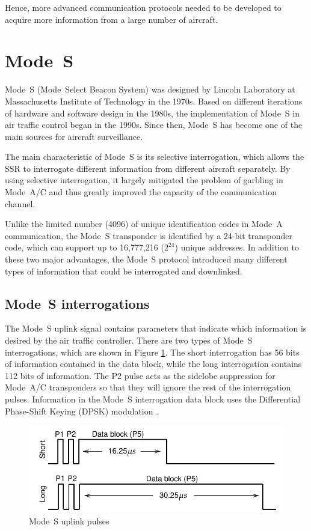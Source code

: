 Hence, more advanced communication protocols needed to be developed to acquire more information from a large number of aircraft.



\section{Mode~S}

Mode~S (Mode~Select Beacon System) was designed by Lincoln Laboratory at Massachusetts Institute of Technology in the 1970s. Based on different iterations of hardware and software design in the 1980s, the implementation of Mode~S in air traffic control began in the 1990s. Since then, Mode~S has become one of the main sources for aircraft surveillance.

The main characteristic of Mode~S is its selective interrogation, which allows the SSR to interrogate different information from different aircraft separately. By using selective interrogation, it largely mitigated the problem of garbling in Mode~A/C and thus greatly improved the capacity of the communication channel.

Unlike the limited number (4096) of unique identification codes in Mode~A communication, the Mode~S transponder is identified by a 24-bit transponder code, which can support up to 16,777,216 ($2^{24}$) unique addresses. In addition to these two major advantages, the Mode~S protocol introduced many different types of information that could be interrogated and downlinked.

\subsection{Mode~S interrogations}
The Mode~S uplink signal contains parameters that indicate which information is desired by the air traffic controller. There are two types of Mode~S interrogations, which are shown in Figure \ref{fig:mode_s_uplink_pulses}. The short interrogation has 56 bits of information contained in the data block, while the long interrogation contains 112 bits of information. The P2 pulse acts as the sidelobe suppression for Mode~A/C transponders so that they will ignore the rest of the interrogation pulses. Information in the Mode~S interrogation data block uses the Differential Phase-Shift Keying (DPSK) modulation \cite{mazda2014}.

\begin{figure}[ht]
  \includegraphics[scale=0.8]{figures/intro/mode_s_uplink_pulses.pdf}
  \caption{Mode~S uplink pulses}
  \label{fig:mode_s_uplink_pulses}
\end{figure}


